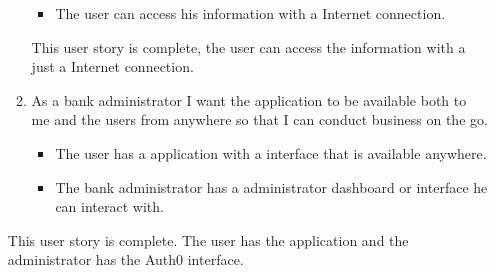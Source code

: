 \begin{itemize}
\begin{enumerate}
\begin{itemize}
                \item The user can access his information with a Internet connection.
            \end{itemize}
        This user story is complete, the user can access the information  with a just a Internet connection.
        \item As a bank administrator I want the application to be available both to me and the users from anywhere so that I can conduct business on the go.
            \begin{itemize}
                \item The user has a application with a interface that is available anywhere.
                \item The bank administrator has a administrator dashboard or interface he can interact with.
            \end{itemize}
        \end{enumerate}
        This user story is complete. The user has the application and the administrator has the Auth0 interface.


\end{itemize}
